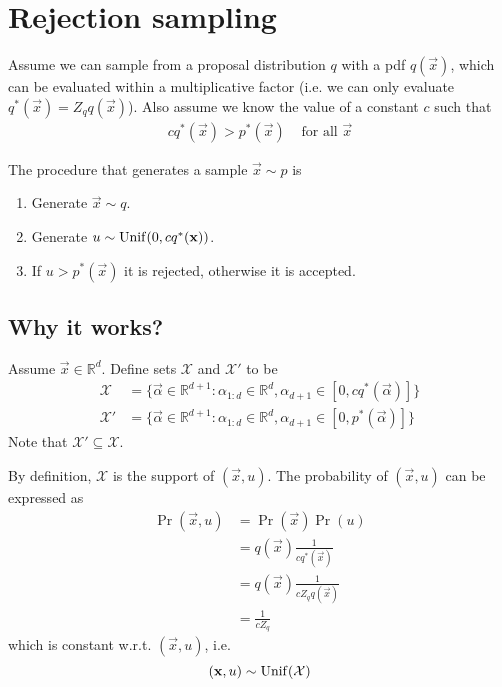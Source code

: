 \section{Rejection sampling}

Assume we can sample from a proposal distribution $q$ with a pdf $q(\vec x)$, which can be evaluated within a multiplicative factor (i.e. we can only evaluate $q^\ast(\vec x) = Z_q q(\vec x)$). Also assume we know the value of a constant $c$ such that
\begin{align}
    c q^\ast(\vec x) > p^\ast(\vec x) & \text{ for all } \vec x
\end{align}

The procedure that generates a sample $\vec x \sim p$ is
\begin{enumerate}
    \item Generate $\vec x \sim q$.
    \item Generate $u \sim \operatorname{Unif}(0, c q^\ast(\boldsymbol{\mathbf{x}}))$.
    \item If $u > p^\ast(\vec x)$ it is rejected, otherwise it is accepted.
\end{enumerate}

\subsection{Why it works?}
    Assume $\vec x \in \mathbb R^d$. Define sets $\mathcal X$ and $\mathcal X'$ to be
    \begin{align}
        \mathcal X &= \{\vec \alpha \in \mathbb R^{d + 1}: \alpha_{1:d} \in \mathbb R^d, \alpha_{d + 1} \in [0, c q^\ast(\vec \alpha)]\} \\
        \mathcal X' &= \{\vec \alpha \in \mathbb R^{d + 1}: \alpha_{1:d} \in \mathbb R^d, \alpha_{d + 1} \in [0, p^\ast(\vec \alpha)]\}
    \end{align}
    Note that $\mathcal X' \subseteq \mathcal X$.

    By definition, $\mathcal X$ is the support of $(\vec x, u)$. The probability of $(\vec x, u)$ can be expressed as
    \begin{align}
        \Pr(\vec x, u)  &= \Pr(\vec x) \Pr(u) \\
                        &= q(\vec x) \frac{1}{c q^\ast(\vec x)} \\
                        &= q(\vec x) \frac{1}{c Z_q q(\vec x)} \\
                        &= \frac{1}{c Z_q}
    \end{align}
    which is constant w.r.t. $(\vec x, u)$, i.e.
    \begin{equation}
        (\boldsymbol{\mathbf{x}}, u) \sim \operatorname{Unif}(\mathcal X)
    \end{equation}

